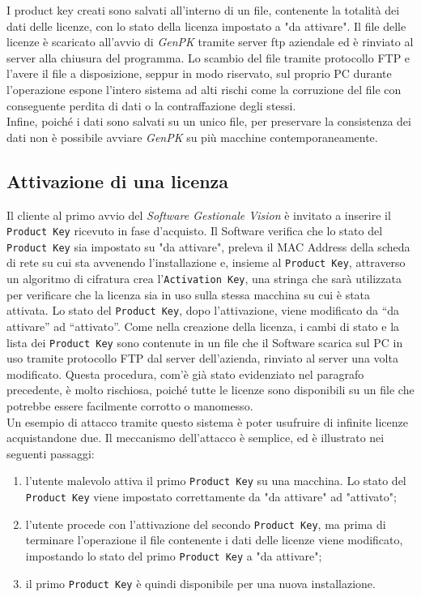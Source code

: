 I product key creati sono salvati all'interno di un file, contenente la totalità dei dati delle licenze, con lo stato della licenza impostato a "da attivare". Il file delle licenze è scaricato all'avvio di \textit{GenPK} tramite server \gls{ftp} aziendale ed è rinviato al server alla chiusura del programma. Lo scambio del file tramite protocollo FTP e l'avere il file a disposizione, seppur in modo riservato, sul proprio PC durante l'operazione espone l'intero sistema ad alti rischi come la corruzione del file con conseguente perdita di dati o la contraffazione degli stessi.\\
Infine, poiché i dati sono salvati su un unico file, per preservare la consistenza dei dati non è possibile avviare \textit{GenPK} su più macchine contemporaneamente.

\subsection{Attivazione di una licenza} 
Il cliente al primo avvio del \textit{Software Gestionale Vision} è invitato a inserire il \texttt{Product Key} ricevuto in fase d'acquisto. Il Software verifica che lo stato del \texttt{Product Key} sia impostato su "da attivare", preleva il \gls{MAC Address} della scheda di rete su cui sta avvenendo l'installazione e, insieme al \texttt{Product Key}, attraverso un algoritmo di cifratura crea l’\texttt{Activation Key}, una stringa che sarà utilizzata per verificare che la licenza sia in uso sulla stessa macchina su cui è stata attivata. Lo stato del \texttt{Product Key}, dopo l'attivazione, viene modificato da “da attivare” ad “attivato”. Come nella creazione della licenza, i cambi di stato e la lista dei \texttt{Product Key} sono contenute in un file che il Software scarica sul PC in uso tramite protocollo FTP dal server dell’azienda, rinviato al server una volta modificato. Questa procedura, com'è già stato evidenziato nel paragrafo precedente, è molto rischiosa, poiché tutte le licenze sono disponibili su un file che potrebbe essere facilmente corrotto o manomesso.\\
Un esempio di attacco tramite questo sistema è poter usufruire di infinite licenze acquistandone due. 
Il meccanismo dell'attacco è semplice, ed è illustrato nei seguenti passaggi:
\begin{enumerate}
\item l'utente malevolo attiva il primo \texttt{Product Key} su una macchina. Lo stato del \texttt{Product Key} viene impostato correttamente da "da attivare" ad "attivato"; 
\item l'utente procede con l'attivazione del secondo \texttt{Product Key}, ma prima di terminare l'operazione il file contenente i dati delle licenze viene modificato, impostando lo stato del primo \texttt{Product Key} a "da attivare";
\item il primo \texttt{Product Key} è quindi disponibile per una nuova installazione.
\end{enumerate}
